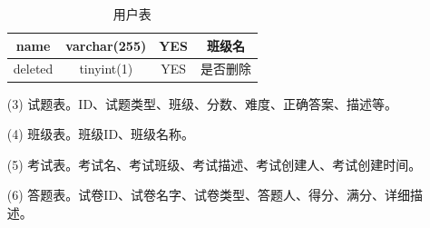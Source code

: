 \begin{enumerate}
\begin{table}[!htbp]
\begin{tabular}{|c|c|c|c|}
			\hline
			name & varchar(255) & YES & 班级名 \\
			\hline
			deleted & tinyint(1) & YES & 是否删除 \\
			\hline
		\end{tabular}
		\caption{用户表}
		\label{table:class}
	\end{table}
	\item[(3)] 试题表。ID、试题类型、班级、分数、难度、正确答案、描述等。
	\item[(4)] 班级表。班级ID、班级名称。
	\item[(5)] 考试表。考试名、考试班级、考试描述、考试创建人、考试创建时间。
	\item[(6)] 答题表。试卷ID、试卷名字、试卷类型、答题人、得分、满分、详细描述。 
\end{enumerate}
